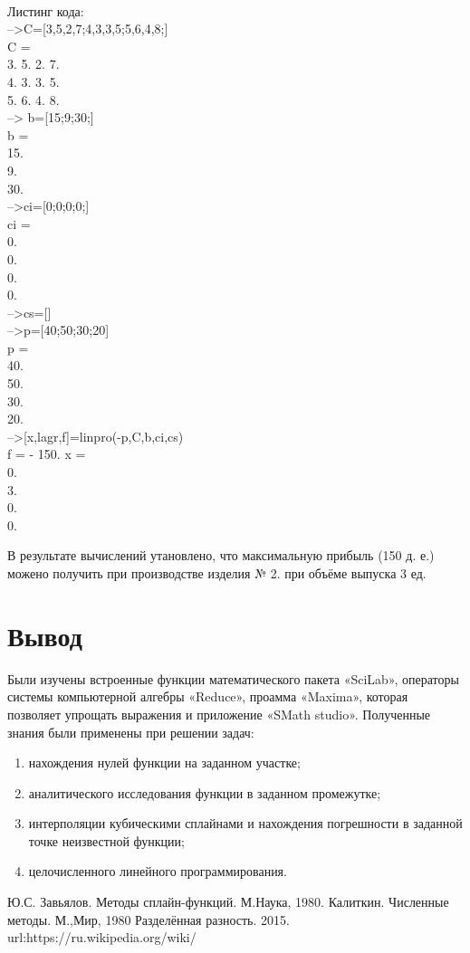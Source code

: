 \documentclass[russian,utf8,nocolumnxxxi,nocolumnxxxii]{eskdtext}
\begin{document}
 \\Листинг кода:
\\-->C=[3,5,2,7;4,3,3,5;5,6,4,8;]
\\ C  =
 \\    3.    5.    2.    7.  
    \\4.    3.    3.    5.  
    \\5.    6.    4.    8.  
 \\--> b=[15;9;30;]  
 \\b  =
 \\    15.  
    \\9.   
    \\30.  
\\-->ci=[0;0;0;0;]
 \\ci  =
 \\   0.  
    \\0.  
   \\ 0.  
    \\0.  
 \\-->cs=[]
\\-->p=[40;50;30;20]
 \\p  =
    \\ 40.  
    \\50.  
    \\30.  
    \\20.  
\\ -->[x,lagr,f]=linpro(-p,C,b,ci,cs)
 \\f  =
   - 150.  
\newpage
 x  =
    \\ 0.  
    \\3.  
    \\0.  
    \\0.
  
В результате вычислений утановлено, что максимальную прибыль (150 д. е.) можено получить при производстве изделия № 2. при объёме выпуска 3 ед.
\newpage
\section{Вывод}

Были изучены встроенные функции математического пакета «SciLab», операторы системы компьютерной алгебры «Reduce», проамма  «Maxima», которая позволяет упрощать выражения и приложение «SMath studio».   Полученные знания были применены при решении задач: \begin{enumerate}
 корни функции аналитическим и численным способом;
 \item нахождения нулей функции на заданном участке;
\item аналитического исследования функции в заданном промежутке;
\item интерполяции кубическими сплайнами и нахождения погрешности в заданной точке неизвестной функции;
\item целочисленного линейного программирования.
\end{enumerate}

\newpage

\begin{thebibliography}{9}
  Ю.С. Завьялов. Методы сплайн-функций. М.Наука, 1980.
  Калиткин. Численные методы. М.,Мир, 1980
  Разделённая разность. 2015. url:https://ru.wikipedia.org/wiki/
\end{thebibliography}
\end{document}
